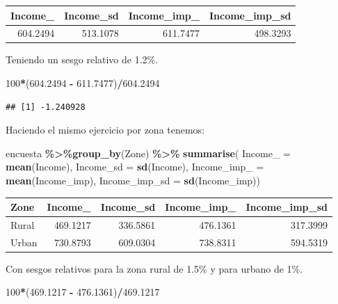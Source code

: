 \documentclass[
  spanish,
  12pt,
]{book}
\newenvironment{Shaded}{\begin{snugshade}}{\end{snugshade}}
\newcommand{\AttributeTok}[1]{\textcolor[rgb]{0.13,0.29,0.53}{#1}}
\newcommand{\DecValTok}[1]{\textcolor[rgb]{0.00,0.00,0.81}{#1}}
\newcommand{\FloatTok}[1]{\textcolor[rgb]{0.00,0.00,0.81}{#1}}
\newcommand{\FunctionTok}[1]{\textcolor[rgb]{0.13,0.29,0.53}{\textbf{#1}}}
\newcommand{\NormalTok}[1]{#1}
\newcommand{\SpecialCharTok}[1]{\textcolor[rgb]{0.81,0.36,0.00}{\textbf{#1}}}
\begin{document}
\begin{tabular}{r|r|r|r}
\hline
Income\_ & Income\_sd & Income\_imp\_ & Income\_imp\_sd\\
\hline
604.2494 & 513.1078 & 611.7477 & 498.3293\\
\hline
\end{tabular}

Teniendo un sesgo relativo de 1.2\%.

\begin{Shaded}
\begin{Highlighting}[]
\DecValTok{100}\SpecialCharTok{*}\NormalTok{(}\FloatTok{604.2494} \SpecialCharTok{{-}} \FloatTok{611.7477}\NormalTok{)}\SpecialCharTok{/}\FloatTok{604.2494}
\end{Highlighting}
\end{Shaded}

\begin{verbatim}
## [1] -1.240928
\end{verbatim}

Haciendo el mismo ejercicio por zona tenemos:

\begin{Shaded}
\begin{Highlighting}[]
\NormalTok{encuesta }\SpecialCharTok{\%\textgreater{}\%}\FunctionTok{group\_by}\NormalTok{(Zone) }\SpecialCharTok{\%\textgreater{}\%}  \FunctionTok{summarise}\NormalTok{(}
  \AttributeTok{Income\_ =} \FunctionTok{mean}\NormalTok{(Income),}
  \AttributeTok{Income\_sd =} \FunctionTok{sd}\NormalTok{(Income),}
  \AttributeTok{Income\_imp\_ =} \FunctionTok{mean}\NormalTok{(Income\_imp),}
  \AttributeTok{Income\_imp\_sd =} \FunctionTok{sd}\NormalTok{(Income\_imp))}
\end{Highlighting}
\end{Shaded}

\begin{tabular}{l|r|r|r|r}
\hline
Zone & Income\_ & Income\_sd & Income\_imp\_ & Income\_imp\_sd\\
\hline
Rural & 469.1217 & 336.5861 & 476.1361 & 317.3999\\
\hline
Urban & 730.8793 & 609.0304 & 738.8311 & 594.5319\\
\hline
\end{tabular}

Con sesgos relativos para la zona rural de 1.5\% y para urbano de 1\%.

\begin{Shaded}
\begin{Highlighting}[]
\DecValTok{100}\SpecialCharTok{*}\NormalTok{(}\FloatTok{469.1217} \SpecialCharTok{{-}} \FloatTok{476.1361}\NormalTok{)}\SpecialCharTok{/}\FloatTok{469.1217}
\end{Highlighting}
\end{Shaded}
\end{document}
